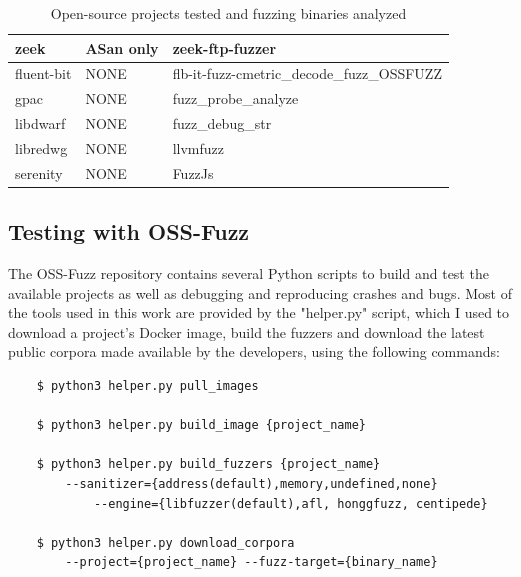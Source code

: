 \begin{table}[h!]
{\begin{tabular}{|l|l|l|}
zeek             & ASan only                & zeek-ftp-fuzzer           \\ 
\hline
fluent-bit       & NONE                & flb-it-fuzz-cmetric\_decode\_fuzz\_OSSFUZZ         \\
gpac             & NONE                & fuzz\_probe\_analyze                               \\
libdwarf         & NONE                & fuzz\_debug\_str                                   \\
libredwg         & NONE                & llvmfuzz                                           \\
serenity         & NONE                & FuzzJs                                             \\
\hline
\end{tabular}}
\vspace{10pt}
\caption{Open-source projects tested and fuzzing binaries analyzed}
\label{fuzzing-table}
\end{table}





\newpage
\subsection{Testing with OSS-Fuzz} \label{test}
The OSS-Fuzz repository contains several Python scripts to build and test the available projects as well as debugging and reproducing crashes and bugs. Most of the tools used in this work are provided by the "helper.py" script, which I used to download a project's Docker image, build the fuzzers and download the latest public corpora made available by the developers, using the following commands:
\begin{verbatim}
    $ python3 helper.py pull_images 

    $ python3 helper.py build_image {project_name}

    $ python3 helper.py build_fuzzers {project_name}
        --sanitizer={address(default),memory,undefined,none} 
            --engine={libfuzzer(default),afl, honggfuzz, centipede}
        
    $ python3 helper.py download_corpora 
        --project={project_name} --fuzz-target={binary_name}
\end{verbatim}

